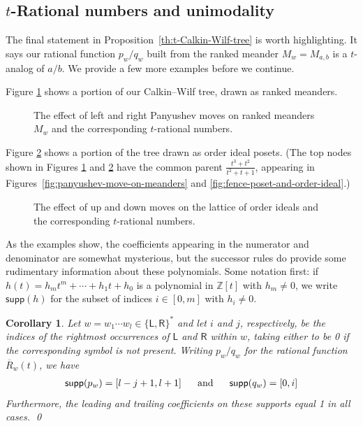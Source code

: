 \documentclass{amsart}
\def\ZZ{\mathbb Z}
\def\qand{\quad\hbox{and}\quad}
\def\pL{\mathsf L}
\def\pR{\mathsf R}
\newtheorem{corollary}[theorem]{Corollary}
\theoremstyle{definition}
\begin{document}
\subsection{$t$-Rational numbers and unimodality}
\label{sec:rank-unimodality}
The final statement in Proposition~\ref{th:t-Calkin-Wilf-tree} is worth highlighting. It says our rational function $p_w/q_w$ built from the ranked meander $M_w=M_{a,b}$ is a $t$-analog of $a/b$. We provide a few more examples before we continue. 

Figure \ref{fig:panyushev_tree} shows a portion of our Calkin--Wilf tree, drawn as ranked meanders. 
%
\begin{figure}[!hbt]
\centering

\caption{The effect of left and right Panyushev moves on ranked meanders $M_{w}$ and the corresponding $t$-rational numbers.} 
\label{fig:panyushev_tree}
\end{figure}
%
Figure \ref{fig:fenceposet_tree} shows a portion of the tree drawn as order ideal posets. 
(The top nodes shown in Figures \ref{fig:panyushev_tree} and \ref{fig:fenceposet_tree} have the common parent $\frac{{t}^3 + {t}^2}{{t}^2 + {t} + 1}$, appearing in Figures~\ref{fig:panyushev-move-on-meanders} and \ref{fig:fence-poset-and-order-ideal}.)
%
\begin{figure}[!hbt]
\centering

\caption{The effect of up and down moves on the lattice of order ideals and the corresponding $t$-rational numbers.}
\label{fig:fenceposet_tree}
\end{figure}
%
As the examples show, the coefficients appearing in the numerator and denominator are somewhat mysterious, but the successor rules do provide some rudimentary information about these polynomials. Some notation first: 
if $h(t) = h_mt^m + \cdots + h_1t + h_0$ is a polynomial in $\ZZ[t]$ with $h_m\neq0$, we write $\mathsf{supp}(h)$ for the subset of indices $i\in[0,m]$ with $h_i \neq0$.

\begin{corollary}\label{th:leading-terms-and-support}
Let $w=w_1\cdots w_l \in \{\pL,\pR\}^*$ and let $i$ and $j$, respectively, be the indices of the rightmost occurrences of $\pL$ and $\pR$ within $w$, taking either  to be 0 if the corresponding symbol is not present. Writing $p_w/q_w$ for the rational function $\overline{R}_{w}(t)$, we have
\begin{gather*}
    \mathsf{supp}(p_{w}) = [l-j+1,l+1]
    \ \ \qand \ \ 
    \mathsf{supp}(q_{w}) = [0,i] 
\end{gather*}
Furthermore, the leading and trailing coefficients on these supports equal 1 in all cases. \qed
\end{corollary}
\end{document}
